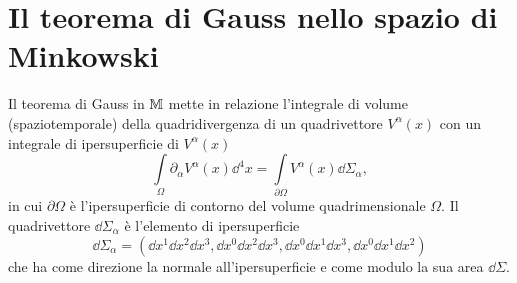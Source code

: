\cleardoublepage
\chapter{Il teorema di Gauss nello spazio di Minkowski}
\label{cha:teorema-gauss}

Il teorema di Gauss in $\mathbb{M}$ mette in relazione l'integrale di volume
(spaziotemporale) della quadridivergenza di un quadrivettore $V^{\alpha}(x)$ con
un integrale di ipersuperficie di $V^{\alpha}(x)$
\begin{equation}
  \int\limits_{\Omega} \partial_{\alpha}V^{\alpha}(x) \dd^{4} x =
  \int\limits_{\partial\Omega} V^{\alpha}(x) \dd\Sigma_{\alpha},
\end{equation}
in cui $\partial\Omega$ è l'ipersuperficie di contorno del volume
quadrimensionale $\Omega$. Il quadrivettore $\dd\Sigma_{\alpha}$ è l'elemento di
ipersuperficie
\begin{equation}
  \dd\Sigma_{\alpha} = (\dd x^{1}\dd x^{2}\dd x^{3}, \dd x^{0}\dd x^{2}\dd
  x^{3}, \dd x^{0}\dd x^{1}\dd x^{3}, \dd x^{0}\dd x^{1}\dd x^{2})
\end{equation}
che ha come direzione la normale all'ipersuperficie e come modulo la sua area
$\dd\Sigma$.

